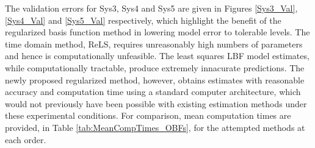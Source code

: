 
The validation errors for Sys3, Sys4 and Sys5 are given in Figures \ref{Sys3_Val}, \ref{Sys4_Val} and \ref{Sys5_Val} respectively, which highlight the benefit of the regularized basis function method in lowering model error to tolerable levels. The time domain method, ReLS, requires unreasonably high numbers of parameters and hence is computationally unfeasible. The least squares LBF model estimates, while computationally tractable, produce extremely innacurate predictions. The newly proposed regularized method, however, obtains estimates with reasonable accuracy and computation time using a standard computer architecture, which would not previously have been possible with existing estimation methods under these experimental conditions. For comparison, mean computation times are provided, in Table \ref{tab:MeanCompTimes_OBFs}, for the attempted methods at each order. 

